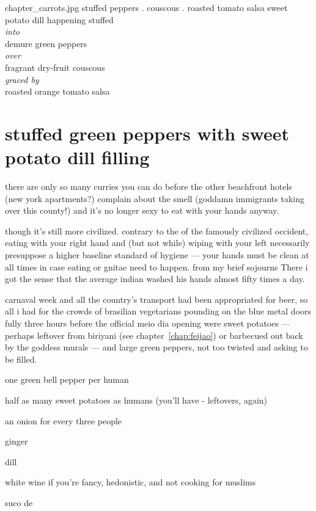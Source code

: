 \mychapter
{chapter_carrots.jpg}
{stuffed peppers . couscous . roasted tomato salsa}
{sweet potato dill happening stuffed\\
\textit{into}\\
demure green peppers\\
\textit{over}\\
fragrant dry-fruit couscous\\
\textit{graced by}\\
roasted orange tomato salsa}

\section{stuffed green peppers with sweet potato dill filling}

there are only so many curries you can do before the other beachfront hotels 
(new york apartments?) complain about the smell (goddamn immigrants taking 
over this county!) and it's no longer sexy to eat with your hands anyway.

though it's still more civilized. contrary to the  of 
the famously civilized occident, eating with your right hand and (but not 
while) wiping with your left necessarily presuppose a higher baseline 
standard of hygiene --- your hands must be clean at all times in case eating 
or gnitae need to happen. from my brief sojourns There i got the sense that 
the average indian washed his hands almost fifty times a day.

carnaval week and all the country's transport had been appropriated for beer, 
so all i had for the crowds of brasilian vegetarians pounding on the blue 
metal doors fully three hours before the official \gls{meio dia} opening were sweet potatoes --- perhaps leftover from biriyani 
(see chapter~\ref{chap:feijao}) or barbecued out back by the 
goddess murals --- and large green peppers, not too twisted and asking to be 
filled.

\begin{ingredients}
  \item one green bell pepper per human
  \item half as many sweet potatoes as humans (you'll have - leftovers, again)
  \item an onion for every three people
  \item ginger
  \item dill
  \item white wine if you're fancy, hedonistic, and not cooking for muslims
  \item suco de 
\end{ingredients}

